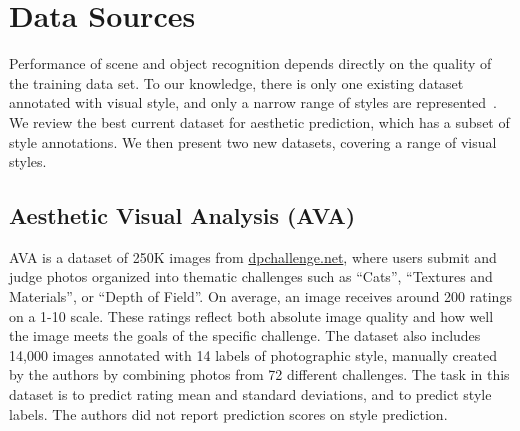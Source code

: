 
\section{Data Sources}

Performance of scene and object recognition depends directly on the quality of the training data set.
To our knowledge, there is only one existing dataset annotated with visual style, and only a narrow range of styles are represented~\cite{Murray-CVPR-2012}. %
We review the best current dataset for aesthetic prediction, which has a subset of style annotations.
We then present two new datasets, covering a range of visual styles.

\subsection{Aesthetic Visual Analysis (AVA)}

AVA \cite{Murray-CVPR-2012}  is a dataset of 250K images from \url{dpchallenge.net}, where users submit and judge photos organized into thematic challenges such as ``Cats'', ``Textures and Materials'', or ``Depth of Field''.
On average, an image receives around 200 ratings on a 1-10 scale.
These ratings reflect both absolute image quality and how well the image meets the goals of the specific challenge.
The dataset also includes 14,000 images annotated with 14 labels of photographic style, manually created by the authors by combining photos from 72 different challenges.
The task in this dataset is to predict rating mean and standard deviations, and to predict style labels. The authors did not report prediction scores on style prediction.

